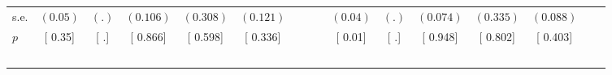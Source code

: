 \begin{longtable}{L{8em} c c c c c c c p{1em} c c c c c c c}
\quad \quad \quad \quad s.e.& $ (     0.05)$ & $ (        .)$ & $ (    0.106)$ & $ (    0.308)$ & $ (    0.121)$ & & & & $ (     0.04)$ & $ (        .)$ & $ (    0.074)$ & $ (    0.335)$ & $ (    0.088)$ & &  \\*
\quad \quad \quad \quad $ p$ & [     0.35] & [        .] & [    0.866] & [    0.598] & [    0.336] & & & & [     0.01] & [        .] & [    0.948] & [    0.802] & [    0.403] & &  \\[1em]
~\\[1em]
\end{longtable}